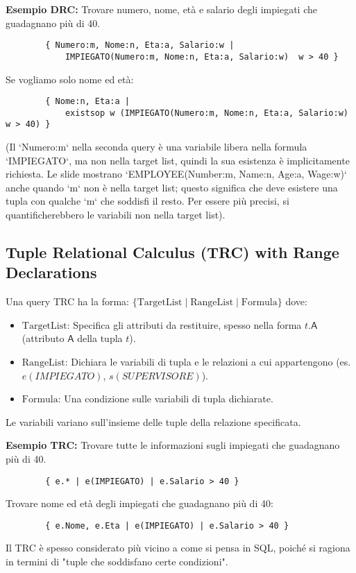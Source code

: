 \documentclass{article}
\newcommand{\Rel}[1]{\textit{#1}} %
\newcommand{\Attr}[1]{\textsf{#1}} %
\begin{document}
	\textbf{Esempio DRC:} Trovare numero, nome, età e salario degli impiegati che guadagnano più di 40.
	\begin{verbatim}
		{ Numero:m, Nome:n, Eta:a, Salario:w |
			IMPIEGATO(Numero:m, Nome:n, Eta:a, Salario:w)  w > 40 }
	\end{verbatim}
	Se vogliamo solo nome ed età:
	\begin{verbatim}
		{ Nome:n, Eta:a |
			existsop w (IMPIEGATO(Numero:m, Nome:n, Eta:a, Salario:w)  w > 40) }
	\end{verbatim}
	(Il `Numero:m` nella seconda query è una variabile libera nella formula `IMPIEGATO`, ma non nella target list, quindi la sua esistenza è implicitamente richiesta. Le slide mostrano `EMPLOYEE(Number:m, Name:n, Age:a, Wage:w)` anche quando `m` non è nella target list; questo significa che deve esistere una tupla con qualche `m` che soddisfi il resto. Per essere più precisi, si quantificherebbero le variabili non nella target list).
	
	\subsection{Tuple Relational Calculus (TRC) with Range Declarations}
	Una query TRC ha la forma:
	$\{ \text{TargetList} \mid \text{RangeList} \mid \text{Formula} \}$
	dove:
	\begin{itemize}
		\item $\text{TargetList}$: Specifica gli attributi da restituire, spesso nella forma $t.\Attr{A}$ (attributo $\Attr{A}$ della tupla $t$).
		\item $\text{RangeList}$: Dichiara le variabili di tupla e le relazioni a cui appartengono (es. $e(\Rel{IMPIEGATO})$, $s(\Rel{SUPERVISORE})$).
		\item $\text{Formula}$: Una condizione sulle variabili di tupla dichiarate.
	\end{itemize}
	Le variabili variano sull'insieme delle tuple della relazione specificata.
	
	\textbf{Esempio TRC:} Trovare tutte le informazioni sugli impiegati che guadagnano più di 40.
	\begin{verbatim}
		{ e.* | e(IMPIEGATO) | e.Salario > 40 }
	\end{verbatim}
	Trovare nome ed età degli impiegati che guadagnano più di 40:
	\begin{verbatim}
		{ e.Nome, e.Eta | e(IMPIEGATO) | e.Salario > 40 }
	\end{verbatim}
	Il TRC è spesso considerato più vicino a come si pensa in SQL, poiché si ragiona in termini di "tuple che soddisfano certe condizioni".
	
\end{document}
